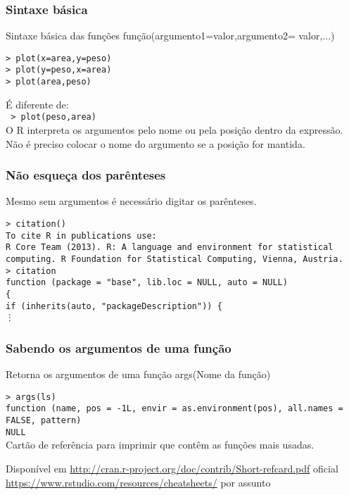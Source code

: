 \documentclass[handout]{beamer}
\begin{document}
 \begin{frame}
 \frametitle{Sintaxe básica}
 \begin{block}{Sintaxe básica das funções}
  função(argumento1=valor,argumento2= valor,...)
 \end{block}
 \texttt{> plot(x=area,y=peso)\\
        > plot(y=peso,x=area)\\
        > plot(area,peso)}

         \vspace{10pt} 
\pause
         É diferente de: \\
       \texttt{ > plot(peso,area)} \\
\pause
\vspace{10pt}
O R interpreta os argumentos pelo nome ou pela posição dentro da expressão. Não é preciso colocar o nome do argumento se a posição for mantida. 
 \end{frame}
 \begin{frame}
   \frametitle{Não esqueça dos parênteses}
   Mesmo sem argumentos é necessário digitar os parênteses. 
   \vspace{10pt}

\texttt{\small  > citation()\\
     \vspace{10pt}
    To cite R in publications use:\\ 
    \vspace{10pt}
  R Core Team (2013). R: A language and environment for statistical 
  computing. R Foundation for Statistical Computing, Vienna, Austria. \\
\pause
\vspace{10pt}
 > citation \\
 function (package =  "base", lib.loc = NULL, auto = NULL) \\
\{ \\
    if (inherits(auto, "packageDescription")) \{ \\
    \vdots   
  } 
 \end{frame}
 \begin{frame}
   \frametitle{Sabendo os argumentos de uma função}
   \begin{block}{Retorna os argumentos de uma função}
      args(Nome da função) \\
       \end{block}
\pause
\texttt{> args(ls) \\
function (name, pos = -1L, envir = as.environment(pos), all.names = FALSE, 
    pattern) \\
NULL\\}
\pause
\vspace{10pt}
   Cartão de referência para imprimir que contêm as funções mais usadas.

   Disponível em \url{http://cran.r-project.org/doc/contrib/Short-refcard.pdf}  oficial \\
                 \url{https://www.rstudio.com/resources/cheatsheets/} por assunto

\end{frame}
\end{document}
